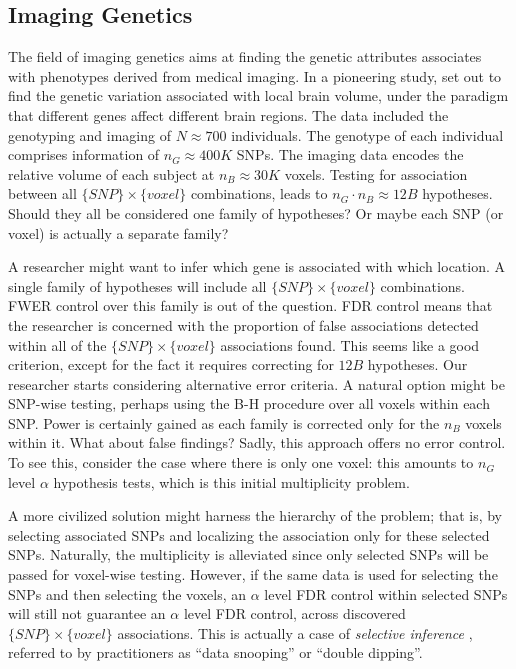 \documentclass[review,12pt]{article}
\theoremstyle{definition}
\begin{document}
\subsection{\label{eg:imaging_genetics}Imaging Genetics}

The field of imaging genetics aims at finding the genetic attributes associates with phenotypes derived from medical imaging. In a pioneering study, \citet{stein_voxelwise_2010} set out to find the genetic variation associated with local brain volume, under the paradigm that different genes affect different brain regions. 
The data included the genotyping and imaging of $N \approx 700$ individuals. 
The genotype of each individual comprises information of $n_G \approx 400K$ SNPs. 
The imaging data encodes the relative volume of each subject at $n_B \approx 30K$ voxels. 
Testing for association between all $\{SNP\} \times \{voxel\}$ combinations, leads to $n_G \cdot n_B \approx 12B$ hypotheses. Should they all be considered one family of hypotheses? Or maybe each SNP (or voxel) is actually a separate family? 

A researcher might want to infer which gene is associated with which location.
A single family of hypotheses will include all $\{SNP\} \times \{voxel\}$ combinations. 
FWER control over this family is out of the question. 
FDR control means that the researcher is concerned with the proportion of false associations detected within all of the $\{SNP\} \times \{voxel\}$ associations found. This seems like a good criterion, except for the fact it requires correcting for $12B$ hypotheses. 
Our researcher starts considering alternative error criteria. 
A natural option might be SNP-wise testing, perhaps using the B-H procedure over all voxels within each SNP. Power is certainly gained as each family is corrected only for the $n_B$ voxels within it. 
What about false findings? Sadly, this approach offers no error control. To see this, consider the case where there is only one voxel: this amounts to $n_G$ level $\alpha$ hypothesis tests, which is this initial multiplicity problem. 

A more civilized solution might harness the hierarchy of the problem; that is, by selecting associated SNPs and localizing the association only for these selected SNPs. 
Naturally, the multiplicity is alleviated since only selected SNPs will be passed for voxel-wise testing. However, if the same data is used for selecting the SNPs and then selecting the voxels, an $\alpha$ level FDR control within selected SNPs will still not guarantee an $\alpha$ level FDR control, across discovered $\{SNP\} \times \{voxel\}$ associations. This is actually a case of \emph{selective inference} \citep{benjamini_simultaneous_2010}, referred to by practitioners as ``data snooping'' or ``double dipping''. 
\end{document}
